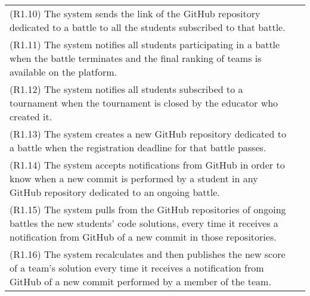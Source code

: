 \begin{longtable}{|p{8cm}|p{8cm}|}
 (R1.10) The system sends the link of the GitHub repository dedicated to a battle to all the students subscribed to that battle. & \\
 (R1.11) The system notifies all students participating in a battle when the battle terminates and the final ranking of teams is available on the platform. & \\
 (R1.12) The system notifies all students subscribed to a tournament when the tournament is closed by the educator who created it. & \\
 (R1.13) The system creates a new GitHub repository dedicated to a battle when the registration deadline for that battle passes. & \\
(R1.14) The system accepts notifications from GitHub in order to know when a new commit is performed by a student in any GitHub repository dedicated to an ongoing battle. & \\
(R1.15) The system pulls from the GitHub repositories of ongoing battles the new students' code solutions, every time it receives a notification from GitHub of a new commit in those repositories. & \\
(R1.16) The system recalculates and then publishes the new score of a team's solution every time it receives a notification from GitHub of a new commit performed by a member of the team. & \\
\hline
\end{longtable}



\vspace{1cm}

